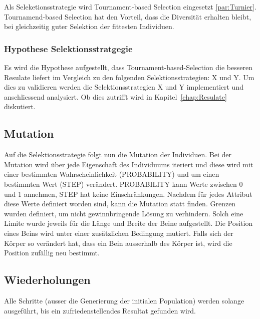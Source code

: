       Als Seleketionsstrategie wird Tournament-based Selection eingesetzt \ref{par:Turnier}. Tournamend-based Selection hat den Vorteil,
      dass die Diversität erhalten bleibt, bei gleichzeitig guter Selektion der fittesten Individuen.

      \subsubsection{Hypothese Selektionsstratgegie\label{sub:Hypothese Selektionsstratgegie}}

        Es wird die Hypothese aufgestellt, dass Tournament-based-Selection die besseren Resulate liefert im Vergleich zu den folgenden Selektionsstrategien: X und Y.
        Um dies zu validieren werden die Selektionsstrategien X und Y implementiert und anschliessend analysiert.
        Ob dies zutrifft wird in Kapitel~\ref{chap:Resulate} diskutiert.

    \subsection{Mutation\label{sec:Mutation}}

      Auf die Selektionsstrategie folgt nun die Mutation der Individuen.
      Bei der Mutation wird über jede Eigenschaft des Individuums iteriert und
      diese wird mit einer bestimmten Wahrscheinlichkeit (PROBABILITY) und um einen bestimmten Wert (STEP) verändert.
      PROBABILITY kann Werte zwischen 0 und 1 annehmen, STEP hat keine Einschränkungen.
      Nachdem für jedes Attribut diese Werte definiert worden sind, kann die Mutation statt finden.
      Grenzen wurden definiert, um nicht gewinnbringende Lösung zu verhindern.
      Solch eine Limite wurde jeweils für die Länge und Breite der Beine aufgestellt.
      Die Position eines Beins wird unter einer zusätzlichen Bedingung mutiert. Falls sich der Körper so verändert hat,
      dass ein Bein ausserhalb des Körper ist, wird die Position zufällig neu bestimmt.

    \subsection{Wiederholungen}
      Alle Schritte (ausser die Generierung der initialen Population) werden solange ausgeführt,
      bis ein zufriedenstellendes Resultat gefunden wird.
